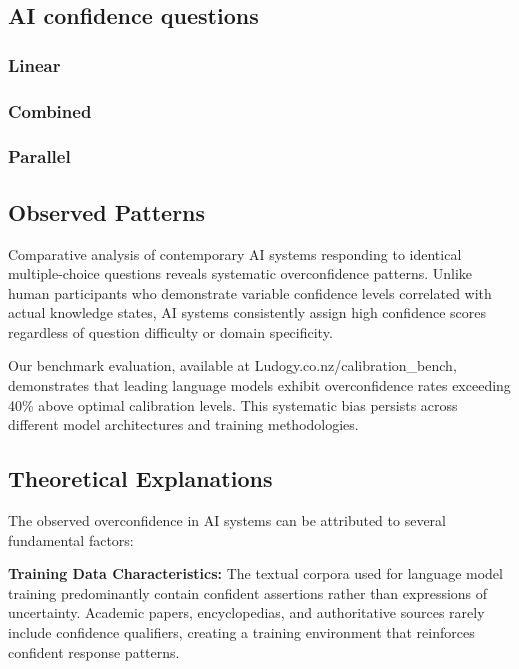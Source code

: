 \documentclass[sigconf]{acmart}
\begin{document}
\subsection{ AI confidence questions}

\subsubsection{ Linear }

\subsubsection { Combined }

\subsubsection { Parallel }

\subsection{Observed Patterns}

Comparative analysis of contemporary AI systems responding to identical multiple-choice questions reveals systematic overconfidence patterns. Unlike human participants who demonstrate variable confidence levels correlated with actual knowledge states, AI systems consistently assign high confidence scores regardless of question difficulty or domain specificity.

Our benchmark evaluation, available at Ludogy.co.nz/calibration\_bench, demonstrates that leading language models exhibit overconfidence rates exceeding 40\% above optimal calibration levels. This systematic bias persists across different model architectures and training methodologies.

\subsection{Theoretical Explanations}

The observed overconfidence in AI systems can be attributed to several fundamental factors:

\textbf{Training Data Characteristics:} The textual corpora used for language model training predominantly contain confident assertions rather than expressions of uncertainty. Academic papers, encyclopedias, and authoritative sources rarely include confidence qualifiers, creating a training environment that reinforces confident response patterns.
\end{document}
